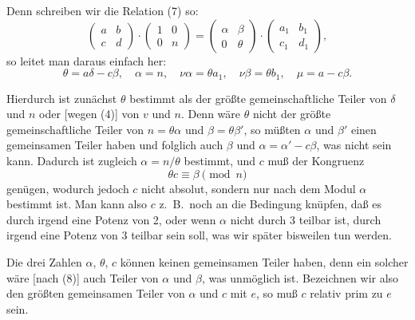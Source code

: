 \documentclass[12pt,a4paper]{article}
\theoremstyle{definition}
\begin{document}
Denn schreiben wir die Relation (7) so:
\[
\begin{pmatrix} a & b \\ c & d \end{pmatrix} \cdot \begin{pmatrix} 1 & 0 \\ 0 & n \end{pmatrix} = \begin{pmatrix} \alpha & \beta \\ 0 & \theta \end{pmatrix} \cdot \begin{pmatrix} a_1 & b_1 \\ c_1 & d_1 \end{pmatrix},
\]
so leitet man daraus einfach her:
\begin{equation}\label{eq:68-8}
\theta = a\delta - c\beta, \quad \alpha = n, \quad \nu\alpha = \theta a_1, \quad \nu\beta = \theta b_1, \quad \mu = a - c\beta.
\end{equation}

Hierdurch ist zunächst $\theta$ bestimmt als der größte gemeinschaftliche Teiler von $\delta$ und $n$ oder [wegen (4)] von $v$ und $n$. Denn wäre $\theta$ nicht der größte gemeinschaftliche Teiler von $n = \theta\alpha$ und $\beta = \theta\beta'$, so müßten $\alpha$ und $\beta'$ einen gemeinsamen Teiler haben und folglich auch $\beta$ und $\alpha = \alpha' - c\beta$, was nicht sein kann. Dadurch ist zugleich $\alpha = n/\theta$ bestimmt, und $c$ muß der Kongruenz
\begin{equation}\label{eq:68-9}
\theta c \equiv \beta \pmod{n}
\end{equation}
genügen, wodurch jedoch $c$ nicht absolut, sondern nur nach dem Modul $\alpha$ bestimmt ist. Man kann also $c$ z.~B.\ noch an die Bedingung knüpfen, daß es durch irgend eine Potenz von 2, oder wenn $\alpha$ nicht durch 3 teilbar ist, durch irgend eine Potenz von 3 teilbar sein soll, was wir später bisweilen tun werden.

Die drei Zahlen $\alpha$, $\theta$, $c$ können keinen gemeinsamen Teiler haben, denn ein solcher wäre [nach (8)] auch Teiler von $\alpha$ und $\beta$, was unmöglich ist. Bezeichnen wir also den größten gemeinsamen Teiler von $\alpha$ und $c$ mit $e$, so muß $c$ relativ prim zu $e$ sein.
\end{document}
